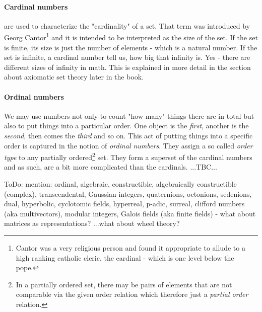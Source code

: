 
\paragraph{Cardinal numbers} are used to characterize the "cardinality" of a set. That term was introduced by Georg Cantor\footnote{Cantor was a very religious person and found it appropriate to allude to a high ranking catholic cleric, the cardinal - which is one level below the pope.} and it is intended to be interpreted as the size of the set. If the set is finite, its size is just the number of elements - which is a natural number. If the set is infinite, a cardinal number tell us, how big that infinity is. Yes - there are different sizes of infinity in math. This is explained in more detail in the section about axiomatic set theory later in the book. 

\paragraph{Ordinal numbers} 
We may use numbers not only to count "how many" things there are in total but also to put things into a particular order. One object is the \emph{first}, another is the \emph{second}, then comes the \emph{third} and so on. This act of putting things into a specific order is captured in the notion of \emph{ordinal numbers}. They assign a so called \emph{order type} to any partially ordered\footnote{In a partially ordered set, there may be pairs of elements that are not comparable via the given order relation which therefore just a \emph{partial order} relation.} set. They form a superset of the cardinal numbers and as such, are a bit more complicated than the cardinals. ...TBC...

\medskip
ToDo: mention: ordinal, algebraic, constructible, algebraically constructible (complex), transcendental, Gaussian integers, quaternions, octonions, sedenions, dual, hyperbolic, cyclotomic fields, hyperreal, p-adic, surreal, clifford numbers (aka multivectors),  modular integers, Galois fields (aka finite fields) - what about matrices as representations? ...what about wheel theory?


